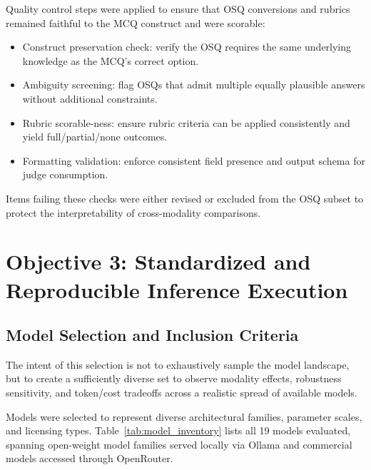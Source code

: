 Quality control steps were applied to ensure that OSQ conversions and rubrics remained faithful to the MCQ construct and were scorable:

\begin{itemize}
    \item Construct preservation check: verify the OSQ requires the same underlying knowledge as the MCQ’s correct option.
    \item Ambiguity screening: flag OSQs that admit multiple equally plausible answers without additional constraints.
    \item Rubric scorable-ness: ensure rubric criteria can be applied consistently and yield full/partial/none outcomes.
    \item Formatting validation: enforce consistent field presence and output schema for judge consumption.
\end{itemize}

Items failing these checks were either revised or excluded from the OSQ subset to protect the interpretability of cross-modality comparisons.




\section{Objective 3: Standardized and Reproducible Inference Execution}
\label{sec:ch3_obj3}

\subsection{Model Selection and Inclusion Criteria}
\label{subsec:ch3_obj3_models}

The intent of this selection is not to exhaustively sample the model landscape, but to create a sufficiently diverse set to observe modality effects, robustness sensitivity, and token/cost tradeoffs across a realistic spread of available models.

Models were selected to represent diverse architectural families, parameter scales, and licensing types. Table~\ref{tab:model_inventory} lists all 19 models evaluated, spanning open-weight model families served locally via Ollama and commercial models accessed through OpenRouter.

